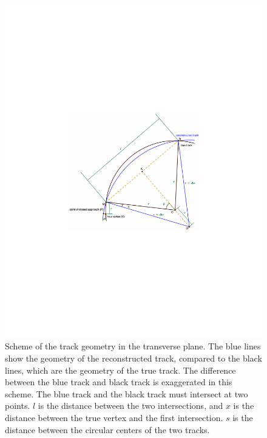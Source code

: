 \begin{figure}[!htb]
      \centering
      \captionsetup{justification=justified}
      \includegraphics[width=\textwidth]{pics/muon_corr/GeoFit/d0_pt_geometry.pdf}
      \caption{Scheme of the track geometry in the transverse plane. 
               The blue lines show the geometry of the reconstructed track, 
               compared to the black lines, which are the geometry of the true track.
               The difference between the blue track and black track is exaggerated in this scheme.
               The blue track and the black track must intersect at two points.
               $l$ is the distance between the two intersections, 
               and $x$ is the distance between the true vertex and the first intersection.
               $s$ is the distance between the circular centers of the two tracks.}
      \label{fig:d0_pt_scheme}
\end{figure}

